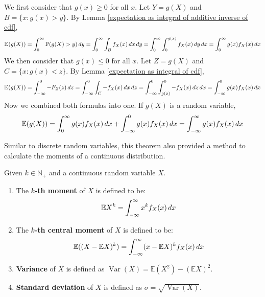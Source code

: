 \documentclass{huhtakm-template-book}
\newcommand{\prob}{\mathbb{P}}
\newcommand{\expect}{\mathbb{E}}
\DeclareMathOperator{\Var}{Var}
\begin{document}
\newpage
\begin{proofing}
	We first consider that $g(x)\geq 0$ for all $x$. Let $Y=g(X)$ and $B=\{x:g(x)>y\}$. By Lemma \ref{expectation as integral of additive inverse of cdf},
	\begin{equation*}
		\expect(g(X))=\intlu{0}{\infty}\prob(g(X)>y)\,dy=\intlu{0}{\infty}\int_{B}f_{X}(x)\,dx\,dy=\intlu{0}{\infty}\intlu{0}{g(x)}f_{X}(x)\,dy\,dx=\intlu{0}{\infty}g(x)f_{X}(x)\,dx
	\end{equation*}
	We then consider that $g(x)\leq 0$ for all $x$. Let $Z=g(X)$ and $C=\{x:g(x)<z\}$. By Lemma \ref{expectation as integral of cdf},
	\begin{equation*}
		\expect(g(X))=\intlu{-\infty}{0}-F_{Z}(z)\,dz=\intlu{-\infty}{0}\int_{C}-f_{X}(x)\,dx\,dz=\intlu{-\infty}{0}\intlu{g(x)}{0}-f_{X}(x)\,dz\,dx=\intlu{-\infty}{0}g(x)f_{X}(x)\,dx
	\end{equation*}
	Now we combined both formulas into one. If $g(X)$ is a random variable,
	\begin{equation*}
		\expect(g(X))=\int_{0}^{\infty}g(x)f_{X}(x)\,dx+\intlu{-\infty}{0}g(x)f_{X}(x)\,dx=\intinfty g(x)f_{X}(x)\,dx
	\end{equation*}
\end{proofing}
Similar to discrete random variables, this theorem also provided a method to calculate the moments of a continuous distribution.
\begin{defn}
	Given $k\in\mathbb{N}_{+}$ and a continuous random variable $X$.
	\begin{enumerate}
		\item The \textbf{$k$-th moment} of $X$ is defined to be:
		\begin{equation*}
			\expect X^{k}=\intinfty x^{k}f_{X}(x)\,dx
		\end{equation*}
		\item The \textbf{$k$-th central moment} of $X$ is defined to be:
		\begin{equation*}
			\expect((X-\expect X)^{k})=\intinfty(x-\expect X)^{k}f_{X}(x)\,dx
		\end{equation*}
		\item \textbf{Variance} of $X$ is defined as $\Var(X)=\expect(X^{2})-(\expect X)^{2}$.
		\item \textbf{Standard deviation} of $X$ is defined as $\sigma=\sqrt{\Var(X)}$.
	\end{enumerate}
\end{defn}
\end{document}
